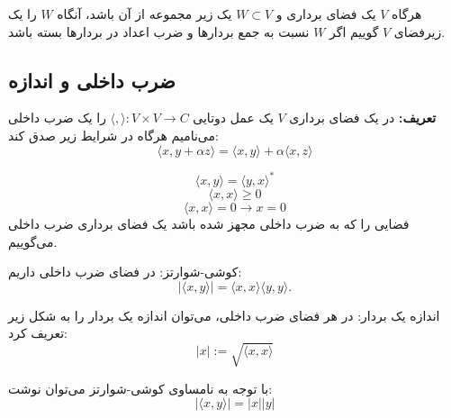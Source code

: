 \begin{definition}
   هرگاه $V$ یک فضای برداری و $W \subset V$ یک زیر مجموعه از آن باشد، آنگاه $W$ را یک زیرفضای $V$ گوییم اگر $W$ نسبت به جمع بردارها و ضرب اعداد در بردارها بسته باشد. 
   \end{definition}
   
   \subsection{ضرب داخلی و اندازه}
    \textbf{تعریف:}
    در یک فضای برداری $V$ یک عمل دوتایی $\langle,\rangle : V \times V \rightarrow C$ را یک ضرب داخلی می‌نامیم هرگاه در شرایط زیر صدق کند:
    \begin{equation}
    	\langle x , y + \alpha z \rangle = \langle x , y \rangle + \alpha \langle x , z \rangle
    \end{equation}
    
    \begin{equation}
    	\langle x , y \rangle = \langle y , x \rangle^{*}
    \end{equation}
    \begin{equation}
    	\langle x , x \rangle \geq 0
    \end{equation}
    \begin{equation}
    	\langle x , x \rangle =  0 \rightarrow x = 0
    \end{equation}
    فضایی را که به ضرب داخلی مجهز شده باشد یک فضای برداری ضرب داخلی می‌گوییم. 
    \begin{theorem}
    کوشی-شوارتز:
     در فضای ضرب داخلی داریم:
\begin{equation}
 	|\langle x,y \rangle | = \langle x,x \rangle \langle y,y \rangle .
 \end{equation}
    \end{theorem}

\begin{definition}{اندازه یک بردار: }
در هر فضای ضرب داخلی، می‌توان اندازه یک بردار را به شکل زیر تعریف کرد:
\begin{equation}
	|x| := \sqrt{\langle x,x \rangle}
\end{equation}
\end{definition}
با توجه به نامساوی کوشی-شوارتز می‌توان نوشت:
\begin{equation}
	 	|\langle x,y \rangle | = |x||y|
\end{equation}


